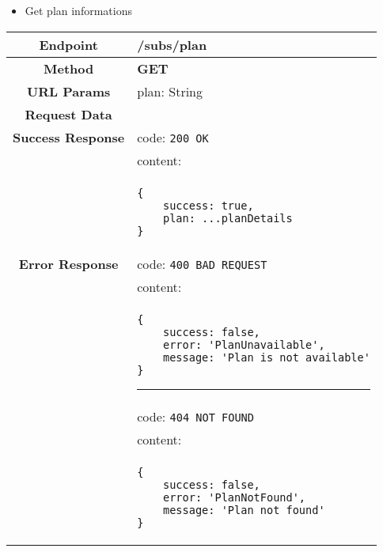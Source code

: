    \begin{itemize}
        \item Get plan informations
    \end{itemize}
    \begin{adjustwidth}{1cm}{}
        \begin{longtable}{|c|l|}
            \hline
            \textbf{Endpoint} & /subs/plan \\
            \hline
            \textbf{Method} & \textbf{GET} \\
            \hline
            \textbf{URL Params} &  plan: String \\
            \hline
            \textbf{Request Data} & \\
            \hline
            \textbf{Success Response} & code: \texttt{200 OK} \\
            &                           content: \\
            & \begin{minipage}[t]{0.5\textwidth}
                \begin{adjustwidth}{1.5cm}{}
                \begin{verbatim}
{
    success: true, 
    plan: ...planDetails
}
                \end{verbatim}
                \end{adjustwidth}
              \end{minipage} \\
              \hline
            \textbf{Error Response} & code: \texttt{400 BAD REQUEST} \\
            &                         content: \\
            & \begin{minipage}[t]{0.7\textwidth}
                \begin{adjustwidth}{1.5cm}{}
                \begin{verbatim}
{
    success: false, 
    error: 'PlanUnavailable',
    message: 'Plan is not available'
}
                \end{verbatim}
                \end{adjustwidth}
                \par\noindent\rule{1.2\textwidth}{1pt}
                 \vspace{4pt}
              \end{minipage} \\
              
              &                     code: \texttt{404 NOT FOUND} \\
              &                     content: \\
              & \begin{minipage}[t]{0.7\textwidth}
                \begin{adjustwidth}{1.5cm}{}
                \begin{verbatim}
{
    success: false, 
    error: 'PlanNotFound',
    message: 'Plan not found'
}
                \end{verbatim}
                \end{adjustwidth}
                

\end{minipage}
\end{longtable}
\end{adjustwidth}
